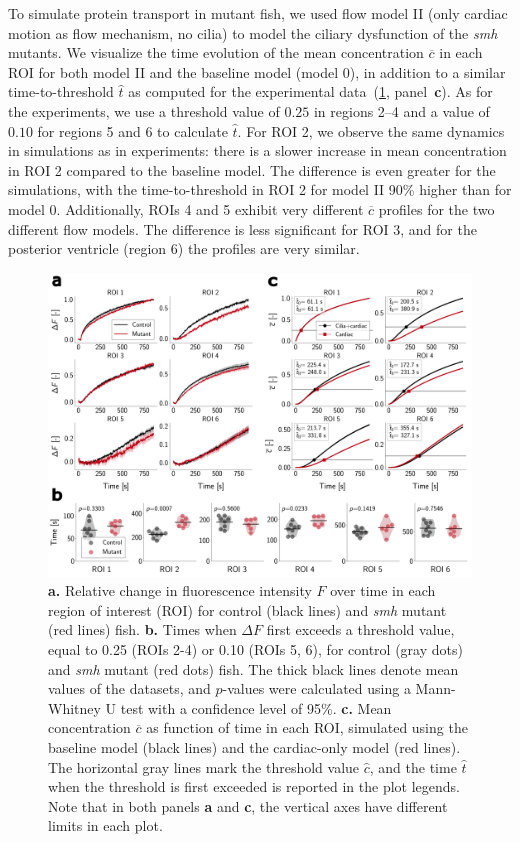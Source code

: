\documentclass[fleqn]{wlscirep}
\begin{document}
To simulate protein transport in mutant fish, we used flow model II (only cardiac motion as flow mechanism, no cilia) to model the ciliary dysfunction of the \emph{smh} mutants. We visualize the time evolution of the mean concentration $\overline{c}$ in each ROI for both model II and the baseline model (model 0), in addition to a similar time-to-threshold $\hat{t}$ as computed for the experimental data~(\cref{fig:figure4_compare_control_mutant}, panel~\textbf{c}). As for the experiments, we use a threshold value of $0.25$ in regions 2--4 and a value of $0.10$ for regions 5 and 6 to calculate $\hat{t}$. For ROI 2, we observe the same dynamics in simulations as in experiments: there is a slower increase in mean concentration in ROI 2 compared to the baseline model. The difference is even greater for the simulations, with the time-to-threshold in ROI 2 for model II 90\% higher than for model 0. Additionally, ROIs 4 and 5 exhibit very different $\overline{c}$ profiles for the two different flow models. The difference is less significant for ROI 3, and for the posterior ventricle (region 6) the profiles are very similar. 
\begin{figure}[H]
    \centering
    \includegraphics[width=\textwidth]{graphics/figure4_compare_control_mutant.png}
    \caption{\textbf{a.} Relative change in fluorescence intensity $F$ over time in each region of interest (ROI) for control (black lines) and \emph{smh} mutant (red lines) fish. 
    \textbf{b.} Times when $\Delta F$ first exceeds a threshold value, equal to 0.25 (ROIs 2-4) or 0.10 (ROIs 5, 6), for control (gray dots) and \emph{smh} mutant (red dots) fish. The thick black lines denote mean values of the datasets, and $p$-values were calculated using a Mann-Whitney U test with a confidence level of 95\%.
    \textbf{c.} Mean concentration $\overline{c}$ as function of time in each ROI, simulated using the baseline model (black lines) and the cardiac-only model (red lines). The horizontal gray lines mark the threshold value $\hat{c}$, and the time $\hat{t}$ when the threshold is first exceeded is reported in the plot legends. Note that in both panels \textbf{a} and \textbf{c}, the vertical axes have different limits in each plot.}
    \label{fig:figure4_compare_control_mutant}
\end{figure}
\end{document}
